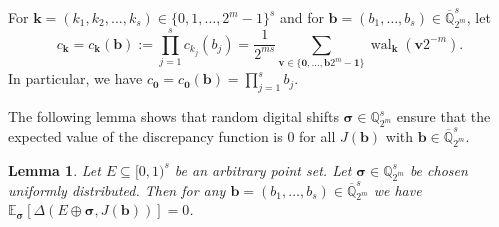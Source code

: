 \documentclass[12pt]{article}
\newtheorem{lemma}[theorem]{Lemma}
\theoremstyle{definition}
\numberwithin{equation}{section}
\begin{document}
For $\bm{k} = (k_1, k_2, \ldots, k_s) \in \{0,1,\ldots,2^m-1\}^s$ and for $\bm{b}=(b_1,\ldots,b_s) \in \overline{\mathbb{Q}}_{2^m}^s$, let 
\begin{equation*}
c_{\bm{k}} = c_{\bm{k}}(\bm{b}) := \prod_{j=1}^s c_{k_j}(b_j) = \frac{1}{2^{ms}} \sum_{\bm{v} \in \{\bm{0}, \ldots, \bm{b} 2^m - \bm{1}\}} \operatorname{wal}_{\bm{k}}(\bm{v} 2^{-m}).
\end{equation*}
In particular, we have $c_{\bm{0}} = c_{\bm{0}}(\bm{b}) = \prod_{j=1}^s b_j$. 

The following lemma shows that random digital shifts $\bm{\sigma} \in \mathbb{Q}_{2^m}^s$ ensure that the expected value of the discrepancy function is $0$ for all $J(\bm{b})$ with $\bm{b} \in \overline{\mathbb{Q}}_{2^m}^s$.

\begin{lemma}\label{lem_Q}
Let $E \subseteq [0,1)^s$ be an arbitrary point set. Let $\bm{\sigma} \in \mathbb{Q}_{2^m}^s$ be chosen uniformly distributed. Then for any $\bm{b}=(b_1,\ldots,b_s) \in \overline{\mathbb{Q}}_{2^m}^s$  we have $\mathbb{E}_{\bm{\sigma}} [\Delta(E \oplus \bm{\sigma},J(\bm{b})) ] = 0$.
\end{lemma}
\end{document}
